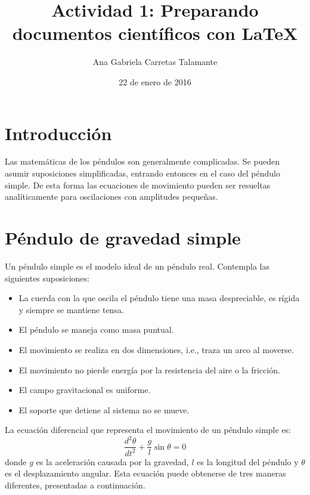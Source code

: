 \documentclass[12pt]{article}
\title{Actividad 1: Preparando documentos científicos con \LaTeX}
\author{Ana Gabriela Carretas Talamante}
\date{22 de enero de 2016}
\begin{document}
\maketitle
\section{Introducción}
Las matemáticas de los péndulos son generalmente complicadas. Se pueden asumir suposiciones simplificadas, entrando entonces en el caso del péndulo simple. De esta forma las ecuaciones de movimiento pueden ser resueltas analíticamente para oscilaciones con amplitudes pequeñas.
\section{Péndulo de gravedad simple}
Un péndulo simple es el modelo ideal de un péndulo real. Contempla las siguientes suposiciones:
\begin{itemize}
\item La cuerda con la que oscila el péndulo tiene una masa despreciable, es rígida y siempre se mantiene tensa.
\item El péndulo se maneja como masa puntual.
\item El movimiento se realiza en dos dimensiones, i.e., traza un arco al moverse.
\item El movimiento no pierde energía por la resistencia del aire o la fricción.
\item El campo gravitacional es uniforme.
\item El soporte que detiene al sistema no se mueve.
\end{itemize}
La ecuación diferencial que representa el movimiento de un péndulo simple es:
\begin{equation}
\label{1}
\frac{d^2\theta}{dt^2} + \frac{g}{l}\sin\theta=0
\end{equation}
donde $g$ es la aceleración causada por la gravedad, $l$ es la longitud del péndulo y $\theta$ es el desplazamiento angular.
Esta ecuación puede obtenerse de tres maneras diferentes, presentadas a continuación.
\end{document}
